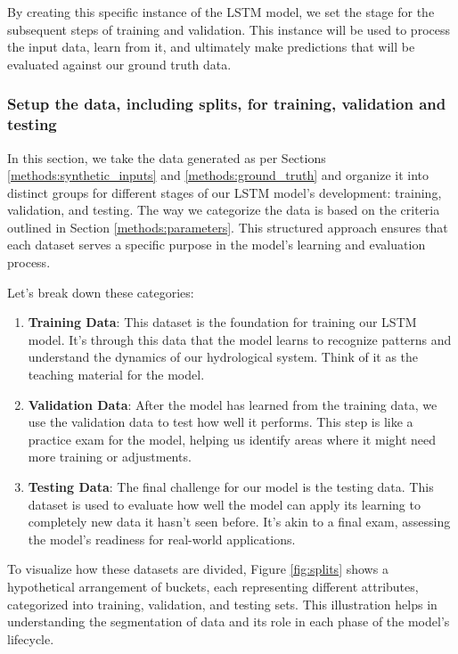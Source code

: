 \documentclass{article}
\begin{document}
By creating this specific instance of the LSTM model, we set the stage for the subsequent steps of training and validation. This instance will be used to process the input data, learn from it, and ultimately make predictions that will be evaluated against our ground truth data.

\subsubsection{Setup the data, including splits, for training, validation and testing}
\label{methods:split}
In this section, we take the data generated as per Sections \ref{methods:synthetic_inputs} and \ref{methods:ground_truth} and organize it into distinct groups for different stages of our LSTM model's development: training, validation, and testing. The way we categorize the data is based on the criteria outlined in Section \ref{methods:parameters}. This structured approach ensures that each dataset serves a specific purpose in the model's learning and evaluation process.

Let's break down these categories:

\begin{enumerate} 
    \item \textbf{Training Data}: This dataset is the foundation for training our LSTM model. It's through this data that the model learns to recognize patterns and understand the dynamics of our hydrological system. Think of it as the teaching material for the model.
    \item \textbf{Validation Data}: After the model has learned from the training data, we use the validation data to test how well it performs. This step is like a practice exam for the model, helping us identify areas where it might need more training or adjustments.
    \item \textbf{Testing Data}: The final challenge for our model is the testing data. This dataset is used to evaluate how well the model can apply its learning to completely new data it hasn't seen before. It's akin to a final exam, assessing the model's readiness for real-world applications.
\end{enumerate}

To visualize how these datasets are divided, Figure \ref{fig:splits} shows a hypothetical arrangement of buckets, each representing different attributes, categorized into training, validation, and testing sets. This illustration helps in understanding the segmentation of data and its role in each phase of the model's lifecycle.
\end{document}
